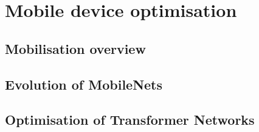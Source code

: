 \section{Mobile device optimisation}
\label{sec:Mobile device optimisation}
\subsection{Mobilisation overview}
\citet{deng2019deep}

\citet{chen2020deep}

\subsection{Evolution of MobileNets}
\citet{howard2017mobilenets}

\citet{sandler2018mobilenetv2}

\citet{howard2019searching}

\citet{chu2020moga}

\subsection{Optimisation of Transformer Networks}
\citet{wu2020lite}

\citet{mehta2020delight}

\citet{tan2021efficientnetv2}